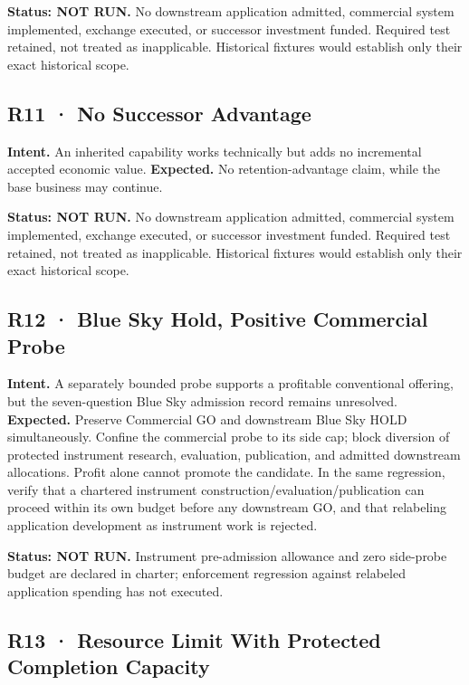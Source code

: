 \documentclass[10pt,letterpaper]{article}
\begin{document}
\textbf{Status: NOT RUN.} No downstream application admitted, commercial
system implemented, exchange executed, or successor investment funded.
Required test retained, not treated as inapplicable. Historical fixtures
would establish only their exact historical scope.

\hypertarget{r11-no-successor-advantage}{%
\subsection{R11 · No Successor
Advantage}\label{r11-no-successor-advantage}}

\textbf{Intent.} An inherited capability works technically but adds no
incremental accepted economic value. \textbf{Expected.} No
retention-advantage claim, while the base business may continue.

\textbf{Status: NOT RUN.} No downstream application admitted, commercial
system implemented, exchange executed, or successor investment funded.
Required test retained, not treated as inapplicable. Historical fixtures
would establish only their exact historical scope.

\hypertarget{r12-blue-sky-hold-positive-commercial-probe}{%
\subsection{R12 · Blue Sky Hold, Positive Commercial
Probe}\label{r12-blue-sky-hold-positive-commercial-probe}}

\textbf{Intent.} A separately bounded probe supports a profitable
conventional offering, but the seven-question Blue Sky admission record
remains unresolved. \textbf{Expected.} Preserve Commercial GO and
downstream Blue Sky HOLD simultaneously. Confine the commercial probe to
its side cap; block diversion of protected instrument research,
evaluation, publication, and admitted downstream allocations. Profit
alone cannot promote the candidate. In the same regression, verify that
a chartered instrument construction/evaluation/publication can proceed
within its own budget before any downstream GO, and that relabeling
application development as instrument work is rejected.

\textbf{Status: NOT RUN.} Instrument pre-admission allowance and zero
side-probe budget are declared in charter; enforcement regression
against relabeled application spending has not executed.

\hypertarget{r13-resource-limit-with-protected-completion-capacity}{%
\subsection{R13 · Resource Limit With Protected Completion
Capacity}\label{r13-resource-limit-with-protected-completion-capacity}}
\end{document}
